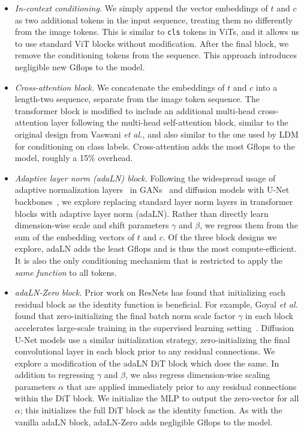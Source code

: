 \documentclass[10pt,twocolumn,letterpaper]{article}
\makeatletter
\def\etal{\emph{et al.}\@\xspace}
\makeatother
\begin{document}
\begin{itemize}
\item[--] \textit{In-context conditioning.} We simply append the vector embeddings of $t$ and $c$ as two additional tokens in the input sequence, treating them no differently from the image tokens. This is similar to \texttt{cls} tokens in ViTs, and it allows us to use standard ViT blocks without modification. After the final block, we remove the conditioning tokens from the sequence. This approach introduces negligible new Gflops to the model.

\item[--] \textit{Cross-attention block.} We concatenate the embeddings of $t$ and $c$ into a length-two sequence, separate from the image token sequence. The transformer block is modified to include an additional multi-head cross-attention layer following the multi-head self-attention block, similar to the original design from Vaswani \etal \cite{Vaswani2017}, and also similar to the one used by LDM for conditioning on class labels. Cross-attention adds the most Gflops to the model, roughly a 15\% overhead.

\item[--] \textit{Adaptive layer norm (adaLN) block.} Following the widespread usage of adaptive normalization layers~\cite{perez2018film} in GANs~\cite{brock2018large,karras2019style} and diffusion models with U-Net backbones~\cite{dhariwal2021adm}, we explore replacing standard layer norm layers in transformer blocks with adaptive layer norm (adaLN). Rather than directly learn dimension-wise scale and shift parameters $\gamma$ and $\beta$, we regress them from the sum of the embedding vectors of $t$ and $c$. Of the three block designs we explore, adaLN adds the least Gflops and is thus the most compute-efficient. It is also the only conditioning mechanism that is restricted to apply the \emph{same function} to all tokens.

\item[--] \textit{adaLN-Zero block.} Prior work on ResNets has found that initializing each residual block as the identity function is beneficial. For example, Goyal \etal found that zero-initializing the final batch norm scale factor $\gamma$ in each block accelerates large-scale training in the supervised learning setting~\cite{Goyal2017b}. Diffusion U-Net models use a similar initialization strategy, zero-initializing the final convolutional layer in each block prior to any residual connections. We explore a modification of the adaLN DiT block which does the same. In addition to regressing $\gamma$ and $\beta$, we also regress dimension-wise scaling parameters $\alpha$ that are applied immediately prior to any residual connections within the DiT block. We initialize the MLP to output the zero-vector for all $\alpha$; this initializes the full DiT block as the identity function. As with the vanilla adaLN block, adaLN-Zero adds negligible Gflops to the model.

\end{itemize}
\end{document}

